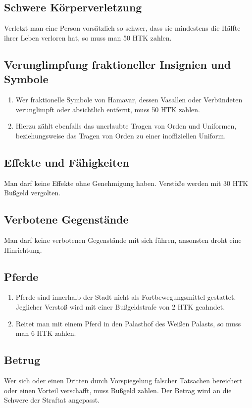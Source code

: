 \documentclass{article}
\begin{document}
\subsection{Schwere Körperverletzung}
Verletzt man eine Person vorsätzlich so schwer, dass sie mindestens die Hälfte ihrer Leben verloren hat, so muss man 50 HTK zahlen.

\subsection{Verunglimpfung fraktioneller Insignien und Symbole}
\begin{enumerate}[(1)]
    \item Wer fraktionelle Symbole von Hamavar, dessen Vasallen oder Verbündeten verunglimpft oder absichtlich entfernt, muss 50 HTK zahlen.
    \item Hierzu zählt ebenfalls das unerlaubte Tragen von Orden und Uniformen, beziehungsweise das Tragen von Orden zu einer inoffiziellen Uniform.    
\end{enumerate}

\subsection{Effekte und Fähigkeiten}
Man darf keine Effekte ohne Genehmigung haben. Verstöße werden mit 30 HTK Bußgeld vergolten.

\subsection{Verbotene Gegenstände}
Man darf keine verbotenen Gegenstände mit sich führen, ansonsten droht eine Hinrichtung.

\subsection{Pferde}
\begin{enumerate}[(1)]
    \item Pferde sind innerhalb der Stadt nicht als Fortbewegungsmittel gestattet. Jeglicher Verstoß wird mit einer Bußgeldstrafe von 2 HTK geahndet.
    \item Reitet man mit einem Pferd in den Palasthof des Weißen Palasts, so muss man 6 HTK zahlen.    
\end{enumerate}

\subsection{Betrug}
Wer sich oder einen Dritten durch Vorspiegelung falscher Tatsachen bereichert oder einen Vorteil verschafft, muss Bußgeld zahlen. Der Betrag wird an die Schwere der Straftat angepasst.
\end{document}
